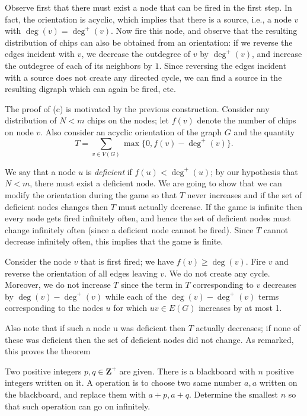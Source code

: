 Observe first that there must exist a node that can be fired in the first step. In fact, the orientation is acyclic, which implies that there is a source, i.e., a node $v$ with $\deg(v) = \deg^+(v)$. Now fire this node, and observe that the resulting distribution of chips can also be obtained from an orientation: if we reverse the edges incident with $v$, we decrease the outdegree of $v$ by $\deg^+(v)$, and increase the outdegree of each of its neighbors by $1$. Since reversing the edges incident with a source does not create any directed cycle, we can find a source in the resulting digraph which can again be fired, etc.

The proof of (c) is motivated by the previous construction. Consider any distribution of $N < m$ chips on the nodes; let $f(v)$ denote the number of chips on node $v$. Also consider an acyclic orientation of the graph $G$ and the quantity \[T = \sum_{v \in V(G)}\max\{0, f(v) - \deg^+(v)\}.\]

We say that a node $u$ is \emph{deficient} if $f(u) < \deg^+(u)$; by our hypothesis that $N < m$, there must exist a deficient node. We are going to show that we can modify the orientation during the game so that $T$ never increases and if the set of deficient nodes changes then $T$ must actually decrease. If the game is infinite then every node gets fired infinitely often, and hence the set of deficient nodes must change infinitely often (since a deficient node cannot be fired). Since $T$ cannot decrease infinitely often, this implies that the game is finite.

Consider the node $v$ that is first fired; we have $f(v) \geq \deg(v)$. Fire $v$ and reverse the orientation of all edges leaving $v$. We do not create any cycle. Moreover, we do not increase $T$ since the term in $T$ corresponding to $v$ decreases by $\deg(v) - \deg^+(v)$ while each of the $\deg(v)-\deg^+(v)$ terms corresponding to the nodes $u$ for which $uv \in E(G)$ increases by at most 1.

Also note that if such a node u was deficient then $T$ actually decreases; if none of these was deficient then the set of deficient nodes did not change. As remarked, this proves the theorem

\begin{example} 
    Two positive integers $p,q \in \mathbf{Z}^{+}$ are given. There is a blackboard with $n$ positive integers written on it. A operation is to choose two same number $a,a$ written on the blackboard, and replace them with $a+p,a+q$. Determine the smallest $n$ so that such operation can go on infinitely.
\end{example}

